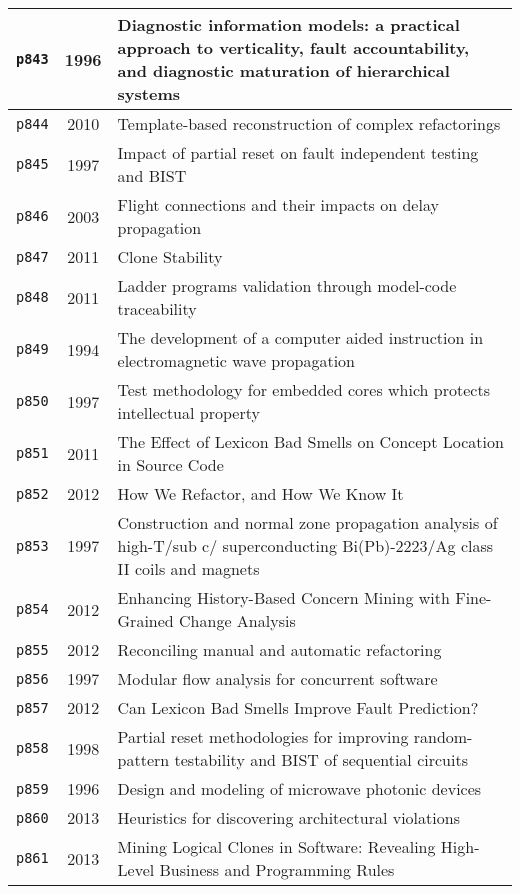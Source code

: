 \begin{longtable}{| c | c | p{16cm} |}
  \hline
  \texttt{p843} & 1996 & Diagnostic information models: a practical approach to verticality, fault accountability, and diagnostic maturation of hierarchical systems \\
  \hline
  \texttt{p844} & 2010 & Template-based reconstruction of complex refactorings \\
  \hline
  \texttt{p845} & 1997 & Impact of partial reset on fault independent testing and BIST \\
  \hline
  \texttt{p846} & 2003 & Flight connections and their impacts on delay propagation \\
  \hline
  \texttt{p847} & 2011 & Clone Stability \\
  \hline
  \texttt{p848} & 2011 & Ladder programs validation through model-code traceability \\
  \hline
  \texttt{p849} & 1994 & The development of a computer aided instruction in electromagnetic wave propagation \\
  \hline
  \texttt{p850} & 1997 & Test methodology for embedded cores which protects intellectual property \\
  \hline
  \texttt{p851} & 2011 & The Effect of Lexicon Bad Smells on Concept Location in Source Code \\
  \hline
  \texttt{p852} & 2012 & How We Refactor, and How We Know It \\
  \hline
  \texttt{p853} & 1997 & Construction and normal zone propagation analysis of high-T/sub c/ superconducting Bi(Pb)-2223/Ag class II coils and magnets \\
  \hline
  \texttt{p854} & 2012 & Enhancing History-Based Concern Mining with Fine-Grained Change Analysis \\
  \hline
  \texttt{p855} & 2012 & Reconciling manual and automatic refactoring \\
  \hline
  \texttt{p856} & 1997 & Modular flow analysis for concurrent software \\
  \hline
  \texttt{p857} & 2012 & Can Lexicon Bad Smells Improve Fault Prediction? \\
  \hline
  \texttt{p858} & 1998 & Partial reset methodologies for improving random-pattern testability and BIST of sequential circuits \\
  \hline
  \texttt{p859} & 1996 & Design and modeling of microwave photonic devices \\
  \hline
  \texttt{p860} & 2013 & Heuristics for discovering architectural violations \\
  \hline
  \texttt{p861} & 2013 & Mining Logical Clones in Software: Revealing High-Level Business and Programming Rules \\

\end{longtable}
